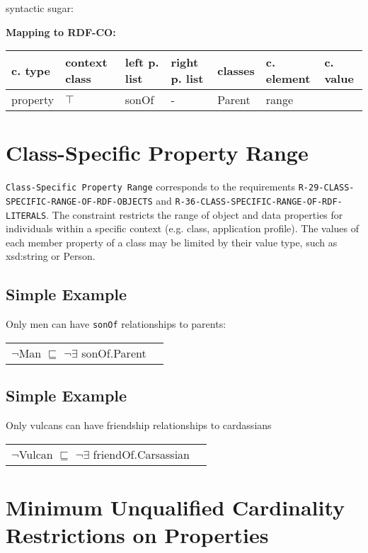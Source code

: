 \documentclass{llncs}
\newcommand{\ms}[1]{\texttt{#1}}
\newenvironment{gcotable}{
  \scriptsize
  \sffamily
  \vspace{0cm}
	\begin{center}
	\textbf{\vspace{0.4cm}Mapping to RDF-CO:} \\
  \begin{tabular}{l|l|l|l|l|l|l}
	\hline
  \textbf{c. type} & \textbf{context class} & \textbf{left p. list} & \textbf{right p. list} & \textbf{classes} & \textbf{c. element} & \textbf{c. value} \\
  \hline

}{
  \hline
  \end{tabular}
	\end{center}
}
\newenvironment{DL}{
  \vspace{0cm}
	\begin{center}
  \begin{tabular}{r l}

}{
  \end{tabular}
	\end{center}
}
\begin{document}
syntactic sugar:

\begin{gcotable}
property & $\top$ & sonOf & - & Parent & range \\
\end{gcotable}

\section{Class-Specific Property Range}

\ms{Class-Specific Property Range} corresponds to the requirements
\ms{R-29-CLASS-} \ms{SPECIFIC-RANGE-OF-RDF-OBJECTS} and \ms{R-36-CLASS-SPECIFIC-RANGE-OF-RDF-} \ms{LITERALS}.
The constraint restricts the range of object and data properties for individuals within a specific context (e.g. class, application profile).
The values of each member property of a class may be limited by their value type, such as xsd:string or Person. 

\subsection{Simple Example}

Only men can have \ms{sonOf} relationships to parents:

\begin{DL}
$\neg$Man $\sqsubseteq$ $\neg\exists$ sonOf.Parent
\end{DL}


\subsection{Simple Example}

Only vulcans can have friendship relationships to cardassians

\begin{DL}
$\neg$Vulcan $\sqsubseteq$ $\neg\exists$ friendOf.Carsassian
\end{DL}

\section{Minimum Unqualified Cardinality Restrictions on Properties}
\end{document}
